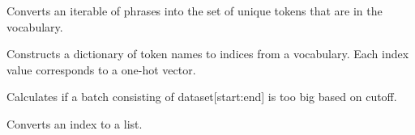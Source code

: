 \documentclass[letterpaper,10pt,english]{sphinxmanual}
\begin{document}
\begin{fulllineitems}
\label{\detokenize{Fireworks:Fireworks.toolbox.text.make_vocabulary}}
Converts an iterable of phrases into the set of unique tokens that are in the vocabulary.

\end{fulllineitems}


\begin{fulllineitems}
\label{\detokenize{Fireworks:Fireworks.toolbox.text.make_indices}}
Constructs a dictionary of token names to indices from a vocabulary.
Each index value corresponds to a one-hot vector.

\end{fulllineitems}


\begin{fulllineitems}
\label{\detokenize{Fireworks:Fireworks.toolbox.text.too_big}}
Calculates if a batch consisting of dataset{[}start:end{]} is too big based on cutoff.

\end{fulllineitems}

\label{\detokenize{Fireworks:module-Fireworks.utils.utils}}

\begin{fulllineitems}
\label{\detokenize{Fireworks:Fireworks.utils.utils.one_hot}}
\end{fulllineitems}


\begin{fulllineitems}
\label{\detokenize{Fireworks:Fireworks.utils.utils.index_to_list}}
Converts an index to a list.

\end{fulllineitems}
\end{document}
